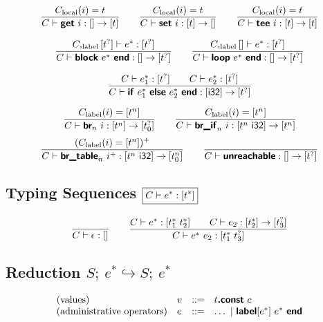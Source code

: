 \documentclass[a4paper]{scrartcl}
\newcommand\f[1]{\ensuremath{\mathop{\mathrm{#1\null}}\nolimits}\xspace}
\newcommand\evalto{\hookrightarrow}
\newcommand\K[1]{\ensuremath{\textsf{#1}}}
\newcommand\KK[1]{\ensuremath{\K{\textbf{#1}}}}
\begin{document}
$$
\frac{
  C_{\f{local}}(i) = t
}{
  C \vdash \KK{get}~i : [] \to [t]
}
\qquad
\frac{
  C_{\f{local}}(i) = t
}{
  C \vdash \KK{set}~i : [t] \to []
}
\qquad
\frac{
  C_{\f{local}}(i) = t
}{
  C \vdash \KK{tee}~i : [t] \to [t]
}
$$

$$
\frac{
  C,_{\f{label}}[t^?] \vdash e^\ast : [t^?]\orbot
}{
  C \vdash \KK{block}~e^\ast~\KK{end} : [] \to [t^?]\orbot
}
\qquad
\frac{
  C,_{\f{label}}[] \vdash e^\ast : [t^?]\orbot
}{
  C \vdash \KK{loop}~e^\ast~\KK{end} : [] \to [t^?]\orbot
}
$$

$$
\frac{
  C \vdash e_1^\ast : [t^?]\orbot
  \qquad
  C \vdash e_2^\ast : [t^?]\orbot
}{
  C \vdash \KK{if}~e_1^\ast~\KK{else}~e_2^\ast~\KK{end} : [\K{i32}] \to [t^?]\orbot
}
$$

$$
\frac{
  C_{\f{label}}(i) = [t^n]
}{
  C \vdash \KK{br}_n~i : [t^n] \to \poly{t_0^?}
}
\qquad
\frac{
  C_{\f{label}}(i) = [t^n]
}{
  C \vdash \KK{br\_if}_n~i : [t^n~\K{i32}] \to [t^n]
}
$$
$$
\frac{
  (C_{\f{label}}(i) = [t^n])^+
}{
  C \vdash \KK{br\_table}_n~i^+ : [t^n~\K{i32}] \to \poly{t_0^n}
}
\qquad
\frac{
}{
  C \vdash \KK{unreachable} : [] \to \poly{t^?}
}
$$


\subsection*{Typing Sequences \hfill $\boxed{C \vdash e^\ast : [t^\ast]}$}

$$
\frac{
}{
  C \vdash \epsilon : []
}
\qquad
\frac{
  C \vdash e^\ast : [t_1^\ast~t_2^\ast]
  \qquad
  C \vdash e_2 : [t_2^\ast] \to [t_3^?]\orbot
}{
  C \vdash e^\ast~e_2 : [t_1^\ast~t_3^?]\orbot
}
\botrule{
\qquad
\frac{
  C \vdash e^\ast : \bot
  \qquad
  C \vdash e_2 : [t_2^\ast] \to [t_3^?]/\bot
}{
  C \vdash e^\ast~e_2 : \bot
}
}
$$


\subsection*{Reduction \hfill $\boxed{S;~e^\ast \evalto S;~e^\ast}$}

$$
\begin{array}{@{}llcl@{}}
\text{(values)} & v &::=&
  t\KK{.const}~c \\
\text{(administrative operators)} & e &::=&
  \dots ~|~
  \KK{label}[e^\ast]~e^\ast~\KK{end} \\
\end{array}
$$
\end{document}
